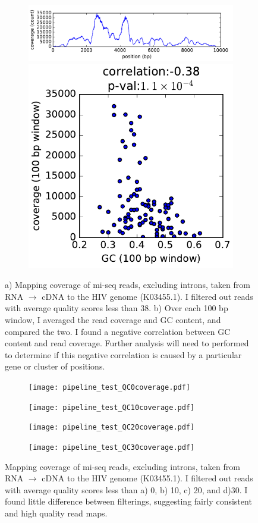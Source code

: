 \documentclass[article]{revtex4}
\begin{document}
\graphicspath{{"./"}}
\begin{figure}
\begin{subfigure}{1\textwidth}
\includegraphics[width=0.99\linewidth]{coverage.pdf}
\caption{}
\includegraphics[width=0.4\linewidth]{correlation.pdf}
\caption{}
\end{subfigure}
\caption{a) Mapping coverage of mi-seq reads, excluding introns, taken from RNA $\rightarrow$ cDNA to the HIV genome (K03455.1). I filtered out reads with average quality scores less than 38. b) Over each 100 bp window, I averaged the read coverage and GC content, and compared the two. I found a negative correlation between GC content and read coverage. Further analysis will need to performed to determine if this negative correlation is caused by a particular gene or cluster of positions. }\label{fig:phred38}
\end{figure}

\graphicspath{{"./STAR_out/"}}
\begin{figure}
\begin{subfigure}{1\textwidth}
\texttt{[image: pipeline\_test\_QC0coverage.pdf]}
\caption{}
\texttt{[image: pipeline\_test\_QC10coverage.pdf]}
\caption{}
\texttt{[image: pipeline\_test\_QC20coverage.pdf]}
\caption{}
\texttt{[image: pipeline\_test\_QC30coverage.pdf]}
\caption{}
\end{subfigure}
\caption{ Mapping coverage of mi-seq reads, excluding introns, taken from RNA $\rightarrow$ cDNA to the HIV genome (K03455.1). I filtered out reads with average quality scores less than a) 0, b) 10, c) 20, and d)30. I found little difference between filterings, suggesting fairly consistent and high quality read maps. }\label{fig:coverage}
\end{figure}
\end{document}
